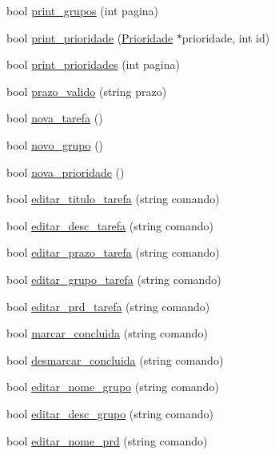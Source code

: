 \begin{DoxyCompactItemize}
\item 
bool \hyperlink{classTerminal_a1b8493b5a3ad18fe1f0ee784a70c6d77}{print\+\_\+grupos} (int pagina)
\item 
bool \hyperlink{classTerminal_a1065a9f3083675e569a9ea49a07e5036}{print\+\_\+prioridade} (\hyperlink{classPrioridade}{Prioridade} $\ast$prioridade, int id)
\item 
bool \hyperlink{classTerminal_a2c636ad455aa6e8f4ee0fc57be74fb09}{print\+\_\+prioridades} (int pagina)
\item 
bool \hyperlink{classTerminal_a04c02a475ddfd34ab7ac354ef35b8878}{prazo\+\_\+valido} (string prazo)
\item 
bool \hyperlink{classTerminal_a05c347f323568a234ea3e12bc0c64315}{nova\+\_\+tarefa} ()
\item 
bool \hyperlink{classTerminal_a80591e4cc7da1010d922a4ffca469eba}{novo\+\_\+grupo} ()
\item 
bool \hyperlink{classTerminal_a15369b06a58cb3b06bfac023e21a2e6e}{nova\+\_\+prioridade} ()
\item 
bool \hyperlink{classTerminal_ae01a6f6ca1a48721d6327051e6fe6a22}{editar\+\_\+titulo\+\_\+tarefa} (string comando)
\item 
bool \hyperlink{classTerminal_a1700bd13d74d5b81ff870bfccfc20e86}{editar\+\_\+desc\+\_\+tarefa} (string comando)
\item 
bool \hyperlink{classTerminal_ae0ddc1e5b294f6fbe62a5a70c267cb72}{editar\+\_\+prazo\+\_\+tarefa} (string comando)
\item 
bool \hyperlink{classTerminal_a08b680a0760ae5fbab03fa2098250c7b}{editar\+\_\+grupo\+\_\+tarefa} (string comando)
\item 
bool \hyperlink{classTerminal_abeeb442470656d2b6a4bf90079c35d74}{editar\+\_\+prd\+\_\+tarefa} (string comando)
\item 
bool \hyperlink{classTerminal_a63b9f303409fd5e787b7918b3d462e51}{marcar\+\_\+concluida} (string comando)
\item 
bool \hyperlink{classTerminal_aad539ca6e1d50e024ec4256bdf3b0e00}{desmarcar\+\_\+concluida} (string comando)
\item 
bool \hyperlink{classTerminal_a542446375398d23c429e38ce92ef2855}{editar\+\_\+nome\+\_\+grupo} (string comando)
\item 
bool \hyperlink{classTerminal_a318e04ea1bea16073451b6014fcde53e}{editar\+\_\+desc\+\_\+grupo} (string comando)
\item 
bool \hyperlink{classTerminal_a2d1957dcc0e404c16073f9c15fa2508e}{editar\+\_\+nome\+\_\+prd} (string comando)

\end{DoxyCompactItemize}
